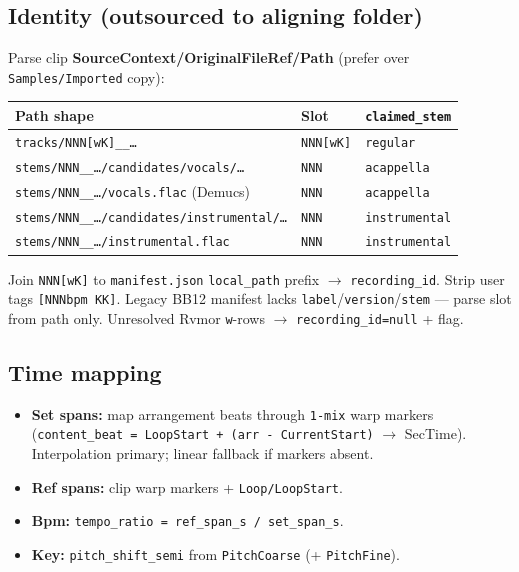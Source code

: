 \documentclass[11pt,a4paper]{article}
\begin{document}
\subsection{Identity (outsourced to aligning folder)}

Parse clip \textbf{SourceContext/OriginalFileRef/Path} (prefer over
\texttt{Samples/Imported} copy):

\begin{center}
\small
\begin{tabular}{@{}lll@{}}
\toprule
Path shape & Slot & \texttt{claimed\_stem} \\
\midrule
\texttt{tracks/NNN[wK]\_\_\ldots} & \texttt{NNN[wK]} & \texttt{regular} \\
\texttt{stems/NNN\_\_\ldots/candidates/vocals/\ldots} & \texttt{NNN} & \texttt{acappella} \\
\texttt{stems/NNN\_\_\ldots/vocals.flac} (Demucs) & \texttt{NNN} & \texttt{acappella} \\
\texttt{stems/NNN\_\_\ldots/candidates/instrumental/\ldots} & \texttt{NNN} & \texttt{instrumental} \\
\texttt{stems/NNN\_\_\ldots/instrumental.flac} & \texttt{NNN} & \texttt{instrumental} \\
\bottomrule
\end{tabular}
\end{center}

Join \texttt{NNN[wK]} to \texttt{manifest.json} \texttt{local\_path} prefix
$\to$ \texttt{recording\_id}. Strip user tags \texttt{[NNNbpm KK]}. Legacy BB12
manifest lacks \texttt{label}/\texttt{version}/\texttt{stem} --- parse slot from path only.
Unresolved Rvmor \texttt{w}-rows $\to$ \texttt{recording\_id=null} + flag.

\subsection{Time mapping}

\begin{itemize}[noitemsep]
  \item \textbf{Set spans:} map arrangement beats through \texttt{1-mix} warp markers
        (\texttt{content\_beat = LoopStart + (arr - CurrentStart)} $\to$ SecTime).
        Interpolation primary; linear fallback if markers absent.
  \item \textbf{Ref spans:} clip warp markers + \texttt{Loop/LoopStart}.
  \item \textbf{Bpm:} \texttt{tempo\_ratio = ref\_span\_s / set\_span\_s}.
  \item \textbf{Key:} \texttt{pitch\_shift\_semi} from \texttt{PitchCoarse} (+ \texttt{PitchFine}).
\end{itemize}
\end{document}
